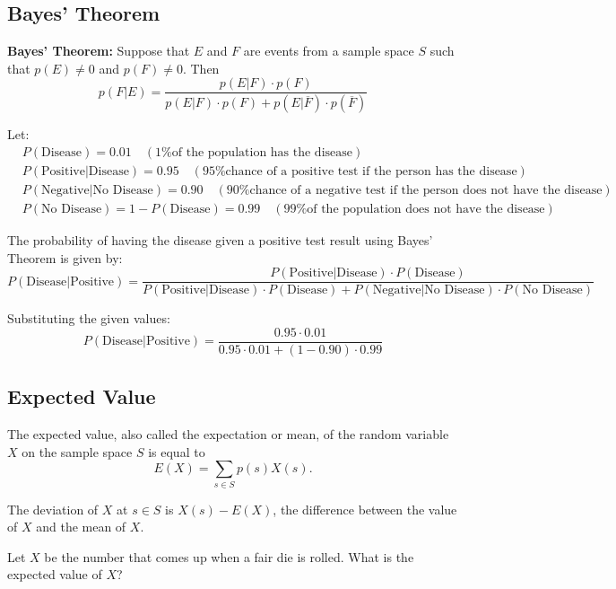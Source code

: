 \subsection{Bayes' Theorem}
\begin{defn}
\textbf{Bayes' Theorem:} Suppose that \(E\) and \(F\) are events from a sample space \(S\) such that \(p(E) \neq 0\) and \(p(F) \neq 0\). Then
\[
p(F | E) = \frac{p(E | F) \cdot p(F)}{p(E | F) \cdot p(F) + p(E | \overline{F}) \cdot p(\overline{F})}
\]
\end{defn}
\begin{exmp}

Let:
\begin{align*}
& P(\text{Disease}) = 0.01 \quad (\text{1\% of the population has the disease}) \\
& P(\text{Positive} | \text{Disease}) = 0.95 \quad (\text{95\% chance of a positive test if the person has the disease}) \\
& P(\text{Negative} | \text{No Disease}) = 0.90 \quad (\text{90\% chance of a negative test if the person does not have the disease}) \\
& P(\text{No Disease}) = 1 - P(\text{Disease}) = 0.99 \quad (\text{99\% of the population does not have the disease})
\end{align*}

The probability of having the disease given a positive test result using Bayes' Theorem is given by:
\[
P(\text{Disease} | \text{Positive}) = \frac{P(\text{Positive} |\text{Disease}) \cdot P(\text{Disease})}{P(\text{Positive} | \text{Disease}) \cdot P(\text{Disease}) + P(\text{Negative} | \text{No Disease}) \cdot P(\text{No Disease})}
\]

Substituting the given values:
\[
P(\text{Disease} | \text{Positive}) = \frac{0.95 \cdot 0.01}{0.95 \cdot 0.01 + (1 - 0.90) \cdot 0.99}
\]

\end{exmp}
\subsection{Expected Value}
\begin{defn}
The expected value, also called the expectation or mean, of the random variable \(X\) on the sample space \(S\) is equal to
\[ E(X) = \sum_{s \in S} p(s)X(s). \]

The deviation of \(X\) at \(s \in S\) is \(X(s) - E(X)\), the difference between the value of \(X\) and the mean of \(X\).

\end{defn}
\begin{exmp}
Let $X$ be the number that comes up when a fair die is rolled. What
is the expected value of $X$?
\vspace{3cm}
\end{exmp}


